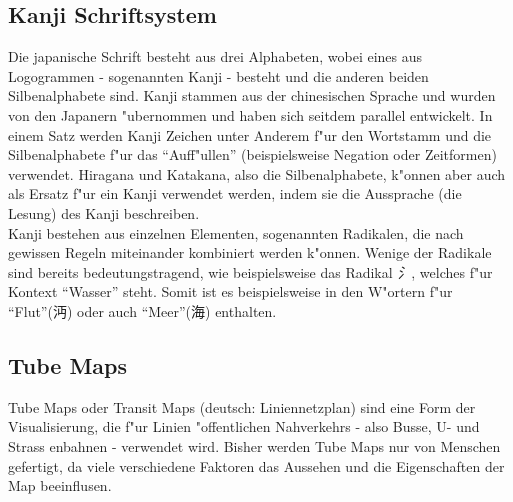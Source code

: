 \subsection{Kanji Schriftsystem}
Die japanische Schrift besteht aus drei Alphabeten, wobei eines aus Logogrammen - sogenannten Kanji - besteht und die anderen beiden Silbenalphabete sind. Kanji stammen aus der chinesischen Sprache und wurden von den Japanern "ubernommen und haben sich seitdem parallel entwickelt. In einem Satz werden Kanji Zeichen unter Anderem f"ur den Wortstamm und die Silbenalphabete f"ur das "`Auff"ullen"' (beispielsweise Negation oder Zeitformen) verwendet. Hiragana und Katakana, also die Silbenalphabete, k"onnen aber auch als Ersatz f"ur ein Kanji verwendet werden, indem sie die Aussprache (die Lesung) des Kanji beschreiben. \\
Kanji bestehen aus einzelnen Elementen, sogenannten Radikalen, die nach gewissen Regeln miteinander kombiniert werden k"onnen. Wenige der Radikale sind bereits bedeutungstragend, wie beispielsweise das Radikal \emph{氵}, welches f"ur Kontext "`Wasser"' steht. Somit ist es beispielsweise in den W"ortern f"ur "`Flut"'(沔) oder auch "`Meer"'(海) enthalten. 

\subsection{Tube Maps}
Tube Maps oder Transit Maps (deutsch: Liniennetzplan) sind eine Form der Visualisierung, die f"ur Linien "offentlichen Nahverkehrs - also Busse, U- und Strass enbahnen - verwendet wird. Bisher werden Tube Maps nur von Menschen gefertigt, da viele verschiedene Faktoren das Aussehen und die Eigenschaften der Map beeinflusen.  
